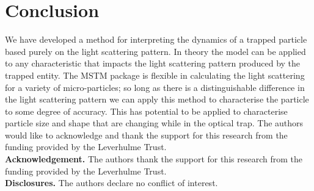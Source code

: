 \documentclass[final, 3p]{elsarticle}
\begin{document}
\section{Conclusion}
\label{sec:Conclusion}

We have developed a method for interpreting the dynamics of a trapped
particle based purely on the light scattering pattern. In theory the
model can be applied to any characteristic that impacts the light
scattering pattern produced by the trapped entity. The MSTM package is
flexible in calculating the light scattering for a variety of
micro-particles; so long as there is a distinguishable difference in
the light scattering pattern we can apply this method to characterise
the particle to some degree of accuracy. This has potential to be
applied to characterise particle size and shape that are changing
while in the optical trap. The authors would like to acknowledge and
thank the support for this research from the funding provided by the
Leverhulme Trust.\\



\noindent \textbf{Acknowledgement.} The authors thank the support for this research from the funding provided by the Leverhulme Trust. \\
  
\noindent \textbf{Disclosures.} The authors declare no conflict of interest. \\


 



\newpage
\appendix
\onecolumn
\end{document}
